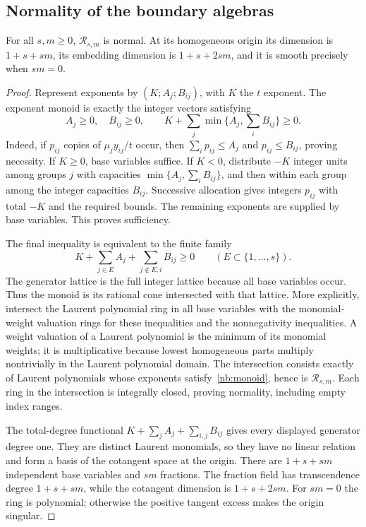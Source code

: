 \subsection{Normality of the boundary algebras}
\label{nb:algebra}

\begin{proposition}\label{nb:monomial}
For all $s,m\geq0$, $\mathcal R_{s,m}$ is normal. At its homogeneous
origin its dimension is $1+s+sm$, its embedding dimension is
$1+s+2sm$, and it is smooth precisely when $sm=0$.
\end{proposition}

\begin{proof}
Represent exponents by $(K;A_j;B_{ij})$, with $K$ the $t$ exponent.
The exponent monoid is exactly the integer vectors satisfying
\begin{equation}\label{nb:monoid}
 A_j\geq0,\quad B_{ij}\geq0,\qquad
 K+\sum_j\min\{A_j,\sum_iB_{ij}\}\geq0.
\end{equation}
Indeed, if $p_{ij}$ copies of $\mu_jy_{ij}/t$ occur, then
$\sum_i p_{ij}\leq A_j$ and $p_{ij}\leq B_{ij}$, proving necessity.
If $K\geq0$, base variables suffice. If $K<0$, distribute $-K$
integer units among groups $j$ with capacities
$\min\{A_j,\sum_iB_{ij}\}$, and then within each group among the
integer capacities $B_{ij}$. Successive allocation gives integers
$p_{ij}$ with total $-K$ and the required bounds. The remaining
exponents are supplied by base variables. This proves sufficiency.

The final inequality is equivalent to the finite family
\[
 K+\sum_{j\in E}A_j+\sum_{j\notin E,i}B_{ij}\geq0
 \qquad(E\subset\{1,\ldots,s\}).
\]
The generator lattice is the full integer lattice because all base
variables occur. Thus the monoid is its rational cone intersected
with that lattice. More explicitly, intersect the Laurent polynomial
ring in all base variables with the monomial-weight valuation rings
for these inequalities and the nonnegativity inequalities. A weight
valuation of a Laurent polynomial is the minimum of its monomial
weights; it is multiplicative because lowest homogeneous parts
multiply nontrivially in the Laurent polynomial domain. The
intersection consists exactly of Laurent polynomials whose exponents
satisfy~\eqref{nb:monoid}, hence is $\mathcal R_{s,m}$. Each ring in
the intersection is integrally closed, proving normality, including
empty index ranges.

The total-degree functional $K+\sum_jA_j+\sum_{i,j}B_{ij}$ gives
every displayed generator degree one. They are distinct Laurent
monomials, so they have no linear relation and form a basis of the
cotangent space at the origin. There are $1+s+sm$ independent base
variables and $sm$ fractions. The fraction field has transcendence
degree $1+s+sm$, while the cotangent dimension is $1+s+2sm$.
For $sm=0$ the ring is polynomial; otherwise the positive tangent
excess makes the origin singular.
\end{proof}

